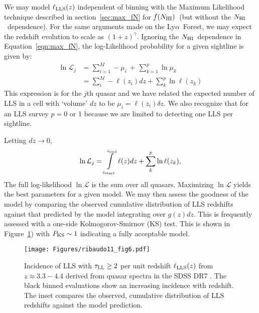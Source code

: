 \documentclass[graybox]{svmult}
\def\lya{Ly$\alpha$}
\def\smm{\sum\limits}
\def\intl{\int\limits}
\newcommand{\mnhi}{N_{\rm HI}}
\newcommand{\nhi}{$\mnhi$}
\def\mfnhi{f(\mnhi)}
\def\fnhi{$\mfnhi$}
\begin{document}
We may model $\ell_{\rm LLS}(z)$ independent of binning 
with the Maximum Likelihood technique described in 
section~\ref{sec:max_fN} for \fnhi\ (but without the
\nhi\ dependence).  
For the same arguments made on the \lya\ Forest, 
we may expect the redshift evolution to scale as $(1+z)^\gamma$.
Ignoring the \nhi\ dependence in Equation~\ref{eqn:max_fN},
the log-Likelihood probability for a given sightline is given by:
\begin{align}
\ln \mathcal{L}_j &= \smm_{i=1}^M -\mu_i \, + \, \smm_{k=1}^p \ln \mu_k \\
&= \smm_i^M -\ell(z_i) dz  + \smm_{k}^p \ln \ell(z_k) 
\label{eqn:max_LLS}
\end{align}
This expression is for the $j$th quasar and we have
related the expected number of LLS in a cell with `volume'
$dz$ to be $\mu_i = \ell(z_i) \delta z$.
We also recognize that for an LLS survey $p = 0$ or 1
because we are limited to detecting one LLS per sightline.

Letting $dz \to 0$,
\begin{equation}
\ln \mathcal{L}_j = \intl_{z_{\rm start}}^{z_{\rm end}} \ell(z) dz
+ \smm_{k}^p \ln \ell(z_k),
\end{equation}
The full log-likelihood $\ln \mathcal{L}$ is the sum over all quasars.
Maximizing $\ln \mathcal{L}$ yields
the best parameters for a given model.
We may then assess the goodness of the model by comparing
the observed cumulative distribution of LLS redshifts
against that predicted by the model integrating over $g(z)dz$. 
This is frequently assessed with a one-side 
Kolmogorov-Smirnov (KS) test.
This is shown in  Figure~\ref{fig:pow_fig4}) with
$P_{\rm KS} \sim 1$ indicating a fully acceptable model.

%
\begin{figure}[b]
\sidecaption
\texttt{[image: Figures/ribaudo11\_fig6.pdf]}
%
%
\caption{Incidence of LLS with $\tau_{\rm LL} \ge 2$
per unit redshift $\ell_{\rm LLS}(z)$ from $z\approx 3.3-4.4$
derived from quasar spectra in the SDSS DR7 \cite{pow10}.
The black binned evaluations show an increasing incidence
with redshift.
The inset compares the observed, cumulative distribution of
LLS redshifts against the model prediction.
}
\label{fig:pow_fig4}       %
\end{figure}
\end{document}
